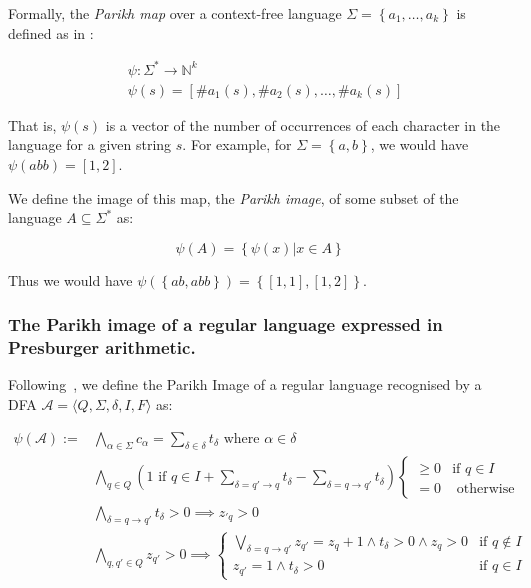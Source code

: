 \documentclass[runningheads]{llncs}
\begin{document}
Formally, the \textit{Parikh map} over a context-free language $\Sigma = \left\{a_1, \ldots, a_k \right\}$ is defined as in \cite{kozen}:

$$
\begin{aligned}
& \psi: \Sigma^* \rightarrow \mathbb{N}^k \\
& \psi(s) = \left[\#a_1(s), \#a_2(s), \ldots, \#a_k(s)\right]
\end{aligned}
$$

That is, $\psi(s)$ is a vector of the number of occurrences of each character in the language for a given string $s$. For example, for  $\Sigma = \left \{ a, b\right\}$, we would have $\psi(abb) = \left[1, 2\right]$.

We define the image of this map, the \textit{Parikh image}, of some subset of the language $A \subseteq \Sigma^*$ as:

$$
\psi(A) = \left\{ \psi(x) | x \in A \right\}
$$

Thus we would have $\psi(\left\{ab, abb\right\}) = \left\{\left[1, 1\right], \left[1, 2\right]\right\}$.

\subsubsection{The Parikh image of a regular language expressed in Presburger arithmetic.}
Following~\cite{generate-parikh-image}, we define the Parikh Image of a regular language recognised by a DFA $\mathcal{A} =  \langle Q, \Sigma,\delta, I, F \rangle$ as:

$$
\begin{aligned}
\psi(\mathcal{A}) := 
& \bigwedge_{\alpha \in \Sigma}
c_\alpha = \sum_{\delta \in \delta} t_\delta  
\text{ where $\alpha \in \delta$}\\
&\bigwedge_{q \in Q} \left (\text{$1$ if $q \in I$} +
\sum_{\delta = q' \xrightarrow{} q} t_\delta 
- \sum_{\delta = q\xrightarrow{}q'} t_\delta \right)
\begin{cases}
\geq 0 & \text{if $q \in I$} \\
= 0 & \text{ otherwise}
\end{cases}\\
& \bigwedge_{\delta = q \xrightarrow{} q'} t_\delta > 0 
\implies z_{'q} > 0 \\
& \bigwedge_{q, q' \in Q} z_{q'} > 0 
\implies 
\begin{cases}
\bigvee\limits_{\delta = q \xrightarrow{} q'} z_{q'} = z_{q} + 1 \land t_\delta > 0 \land z_{q} > 0 & \text{if $q \not\in  I$} \\
z_{q'} = 1 \land t_\delta > 0& \text{if $q \in I$}
\end{cases}
\end{aligned}
$$
\end{document}

